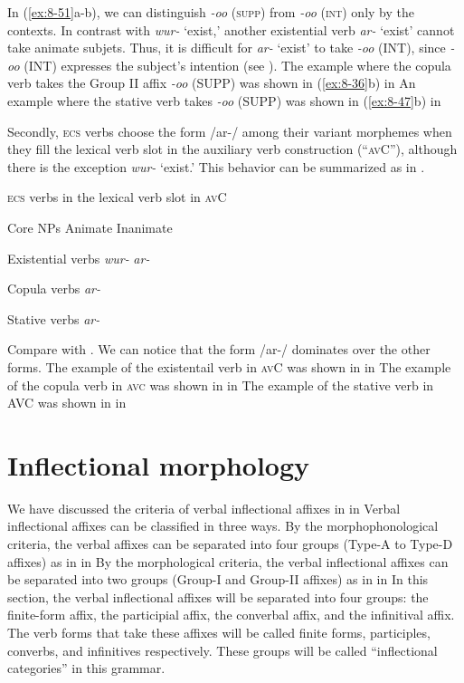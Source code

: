 In (\ref{ex:8-51}a-b), we can distinguish \textit{-oo} (\textsc{supp}) from \textit{-oo} (\textsc{int}) only by the contexts. In contrast with \textit{wur-} ‘exist,’ another existential verb \textit{ar-} ‘exist’ cannot take animate subjets. Thus, it is difficult for \textit{ar-} ‘exist’ to take \textit{-oo} (INT), since \textit{-oo} (INT) expresses the subject’s intention (see ). The example where the copula verb takes the Group II affix \textit{-oo} (SUPP) was shown in (\ref{ex:8-36}b) in  An example where the stative verb takes \textit{-oo} (SUPP) was shown in (\ref{ex:8-47}b) in 

  Secondly, \textsc{ecs} verbs choose the form /ar-/ among their variant morphemes when they fill the lexical verb slot in the auxiliary verb construction (“\textsc{av}C”), although there is the exception \textit{wur-} ‘exist.’ This behavior can be summarized as in .

\begin{table}
\caption{\label{tab:key:76}\textsc{ecs} verbs in the lexical verb slot in \textsc{av}C}

Core NPs  Animate  Inanimate

Existential verbs  \textit{wur-}  \textit{ar-}

Copula verbs  \textit{ar-}

Stative verbs  \textit{ar-}
\end{table}

Compare  with . We can notice that the form /ar-/ dominates over the other forms. The example of the existentail verb in \textsc{av}C was shown in  in  The example of the copula verb in \textsc{avc} was shown in  in  The example of the stative verb in AVC was shown in  in 

\section{Inflectional morphology}

We have discussed the criteria of verbal inflectional affixes in  in  Verbal inflectional affixes can be classified in three ways. By the morphophonological criteria, the verbal affixes can be separated into four groups (Type-A to Type-D affixes) as in  in  By the morphological criteria, the verbal inflectional affixes can be separated into two groups (Group-I and Group-II affixes) as in  in  In this section, the verbal inflectional affixes will be separated into four groups: the finite-form affix, the participial affix, the converbal affix, and the infinitival affix. The verb forms that take these affixes will be called finite forms, participles, converbs, and infinitives respectively. These groups will be called “inflectional categories” in this grammar.

